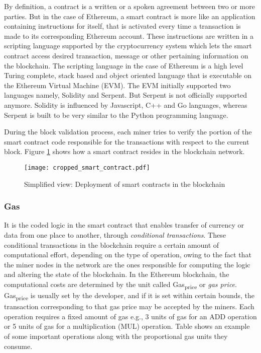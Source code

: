 \documentclass[english]{tktltiki}
\begin{document}
By definition, a contract is a written or a spoken agreement between two or more parties. But in the case of Ethereum, a smart contract is more like an application containing instructions for itself, that is activated every time a transaction is made to its corresponding Ethereum account. These instructions are written in a scripting language supported by the cryptocurrency system which lets the smart contract access desired transaction, message or other pertaining information on the blockchain. The scripting language in the case of Ethereum is a high level Turing complete, stack based and object oriented language that is executable on the Ethereum Virtual Machine (EVM). The EVM initially supported two languages namely, Solidity and Serpent. But Serpent is not officially supported anymore. Solidity is influenced by Javascript, C++ and Go languages, whereas Serpent is built to be very similar to the Python programming language. 

During the block validation process, each miner tries to verify the portion of the smart contract code responsible for the transactions with respect to the current block\cite{eth-whitepaper}. Figure \ref{smart contract deploy} shows how a smart contract resides in the blockchain network.

\begin{figure}[H]
\begin{center}
\texttt{[image: cropped\_smart\_contract.pdf]}
\caption{Simplified view: Deployment of smart contracts in the blockchain}
\label{smart contract deploy}
\end{center}
\end{figure}


\subsubsection*{Gas} \label{subsection: gas}
It is the coded logic in the smart contract that enables transfer of currency or data from one place to another, through \textit{conditional transactions}. These conditional transactions in the blockchain require a certain amount of computational effort, depending on the type of operation, owing to the fact that the miner nodes in the network are the ones responsible for computing the logic and altering the state of the blockchain. In the Ethereum blockchain, the computational costs are determined by the unit called Gas\textsubscript{price} or \textit{gas price}. Gas\textsubscript{price} is usually set by the developer, and if it is set within certain bounds, the transaction corresponding to that gas price may be accepted by the miners. 
Each operation requires a fixed amount of gas e.g., 3 units of gas for an ADD operation or 5 units of gas for a multiplication (MUL) operation. Table shows an example of some important operations along with the proportional gas units they consume.
\end{document}
